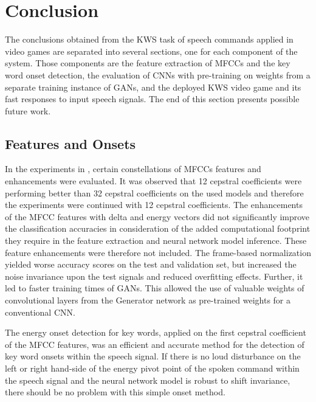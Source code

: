 
\chapter{Conclusion}\label{sec:conclusion}
The conclusions obtained from the KWS task of speech commands applied in video games are separated into several sections, one for each component of the system.
Those components are the feature extraction of MFCCs and the key word onset detection, the evaluation of CNNs with pre-training on weights from a separate training instance of GANs, and the deployed KWS video game and its fast responses to input speech signals.
The end of this section presents possible future work.



\section{Features and Onsets}
In the experiments in , certain constellations of MFCCs features and enhancements were evaluated.
It was observed that 12 cepstral coefficients were performing better than 32 cepstral coefficients on the used models and therefore the experiments were continued with 12 cepstral coefficients.
The enhancements of the MFCC features with delta and energy vectors did not significantly improve the classification accuracies in consideration of the added computational footprint they require in the feature extraction and neural network model inference. 
These feature enhancements were therefore not included.
The frame-based normalization yielded worse accuracy scores on the test and validation set, but increased the noise invariance upon the test signals and reduced overfitting effects.
Further, it led to faster training times of GANs.
This allowed the use of valuable weights of convolutional layers from the Generator network as pre-trained weights for a conventional CNN.

The energy onset detection for key words, applied on the first cepstral coefficient of the MFCC features, was an efficient and accurate method for the detection of key word onsets within the speech signal.
If there is no loud disturbance on the left or right hand-side of the energy pivot point of the spoken command within the speech signal and the neural network model is robust to shift invariance, there should be no problem with this simple onset method.




